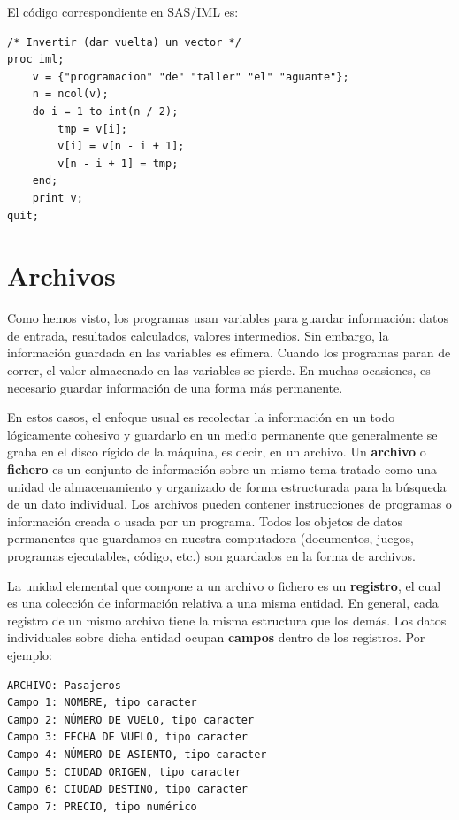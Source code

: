 \documentclass[]{book}
\begin{document}
El código correspondiente en SAS/IML es:

\begin{verbatim}
/* Invertir (dar vuelta) un vector */
proc iml;
    v = {"programacion" "de" "taller" "el" "aguante"};
    n = ncol(v);
    do i = 1 to int(n / 2);
        tmp = v[i];
        v[i] = v[n - i + 1];
        v[n - i + 1] = tmp;
    end;
    print v;
quit;
\end{verbatim}

\chapter{Archivos}\label{archivos}

Como hemos visto, los programas usan variables para guardar información:
datos de entrada, resultados calculados, valores intermedios. Sin
embargo, la información guardada en las variables es efímera. Cuando los
programas paran de correr, el valor almacenado en las variables se
pierde. En muchas ocasiones, es necesario guardar información de una
forma más permanente.

En estos casos, el enfoque usual es recolectar la información en un todo
lógicamente cohesivo y guardarlo en un medio permanente que generalmente
se graba en el disco rígido de la máquina, es decir, en un archivo. Un
\textbf{archivo} o \textbf{fichero} es un conjunto de información sobre
un mismo tema tratado como una unidad de almacenamiento y organizado de
forma estructurada para la búsqueda de un dato individual. Los archivos
pueden contener instrucciones de programas o información creada o usada
por un programa. Todos los objetos de datos permanentes que guardamos en
nuestra computadora (documentos, juegos, programas ejecutables, código,
etc.) son guardados en la forma de archivos.

La unidad elemental que compone a un archivo o fichero es un
\textbf{registro}, el cual es una colección de información relativa a
una misma entidad. En general, cada registro de un mismo archivo tiene
la misma estructura que los demás. Los datos individuales sobre dicha
entidad ocupan \textbf{campos} dentro de los registros. Por ejemplo:

\begin{verbatim}
ARCHIVO: Pasajeros
Campo 1: NOMBRE, tipo caracter
Campo 2: NÚMERO DE VUELO, tipo caracter
Campo 3: FECHA DE VUELO, tipo caracter
Campo 4: NÚMERO DE ASIENTO, tipo caracter
Campo 5: CIUDAD ORIGEN, tipo caracter
Campo 6: CIUDAD DESTINO, tipo caracter
Campo 7: PRECIO, tipo numérico
\end{verbatim}
\end{document}
